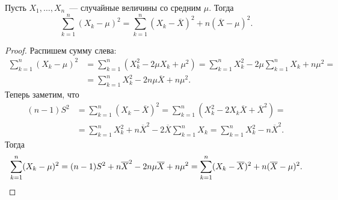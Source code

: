 \begin{lemma}
    Пусть \(X_{1}, \dots, X_{n}\)~--- случайные величины со средним \(\mu\). Тогда
    \[
        \sum_{k = 1}^{n} (X_{k} - \mu)^{2} = \sum_{k = 1}^{n} (X_{k} - \overline{X})^{2} 
        + n(\overline{X} - \mu)^{2}.
    \]
\end{lemma}
\begin{proof}
    Распишем сумму слева:
    \begin{align*}
        \sum_{k = 1}^{n} (X_{k} - \mu)^{2} &= \sum_{k = 1}^{n} (X_{k}^{2} - 2\mu X_{k} + 
        \mu^{2}) = \sum_{k = 1}^{n} X_{k}^{2} - 2\mu\sum_{k = 1}^{n} X_{k} + n\mu^{2} = 
        \\ &= \sum_{k = 1}^{n} X_{k}^{2} - 2n\mu\overline{X} + n\mu^{2}.
    \end{align*}
    Теперь заметим, что
    \begin{align*}
        (n - 1)S^{2} &= \sum_{k = 1}^{n} (X_{k} - \overline{X})^{2} = \sum_{k = 1}^{n} 
        \left(X_{k}^{2} - 2X_{k}\overline{X} + \overline{X}^{2}\right) = \\ 
        &= \sum_{k = 1}^{n} X_{k}^{2} + n\overline{X}^{2} - 2\overline{X}\sum_{k = 
        1}^{n}X_{k} = \sum_{k = 1}^{n} X_{k}^{2} - n\overline{X}^{2}.
    \end{align*}
    Тогда
    \[
        \sum_{k = 1}^{n} (X_{k} - \mu)^{2} = (n - 1)S^{2} + n\overline{X}^{2} - 
        2n\mu\overline{X} + n\mu^{2} = \sum_{k = 1}^{n} (X_{k} - \overline{X})^{2} 
        + n(\overline{X} - \mu)^{2}. \qedhere
    \]
\end{proof}

